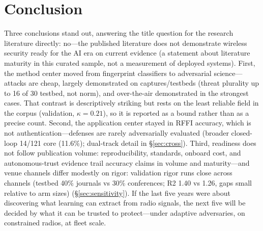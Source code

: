 \section{Conclusion}
\label{sec:conclusion}
Three conclusions stand out, answering the title question for the research literature directly: no---the published literature does not demonstrate wireless security ready for the AI era on current evidence (a statement about literature maturity in this curated sample, not a measurement of deployed systems). First, the method center moved from fingerprint classifiers to adversarial science---attacks are cheap, largely demonstrated on captures/testbeds (threat plurality up to 16 of 30 testbed, not norm), and over-the-air demonstrated in the strongest cases. That contrast is descriptively striking but rests on the least reliable field in the corpus (validation, $\kappa = 0.21$), so it is reported as a bound rather than as a precise count. Second, the application center stayed in RFFI accuracy, which is not authentication---defenses are rarely adversarially evaluated (broader closed-loop 14/121 core (11.6\%); dual-track detail in \S\ref{sec:cross}). Third, readiness does not follow publication volume: reproducibility, standards, onboard cost, and autonomous-trust evidence trail accuracy claims in volume and maturity---and venue channels differ modestly on rigor: validation rigor runs close across channels (testbed 40\% journals vs 30\% conferences; R2 1.40 vs 1.26, gaps small relative to arm sizes) (\S\ref{sec:sensitivity}). If the last five years were about discovering what learning can extract from radio signals, the next five will be decided by what it can be trusted to protect---under adaptive adversaries, on constrained radios, at fleet scale.
